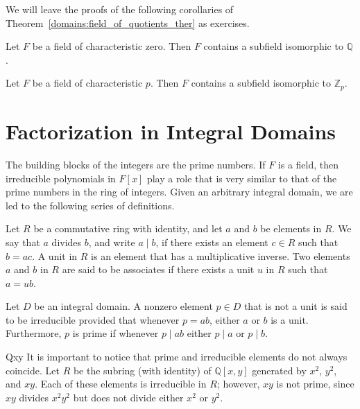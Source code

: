  

We will leave the proofs of the following corollaries of Theorem~\ref{domains:field_of_quotients_ther}
as exercises. 
 

\begin{corollary}\label{domains:char_zero_rationals_corollary}
Let $F$ be a field of characteristic zero. Then $F$ contains a
subfield isomorphic to ${\mathbb Q}$.	       
\end{corollary}


\begin{corollary}\label{domains:char_p_Zp_corollary}
Let $F$ be a field of characteristic $p$. Then $F$ contains a
subfield isomorphic to ${\mathbb Z}_p$.	       
\end{corollary}
 


\section{Factorization in Integral Domains}

 
The building blocks of the integers are the prime numbers.  If $F$ is
a field, then irreducible polynomials in $F[x]$ play a role that is
very similar to that of the prime numbers in the ring of integers.
Given an arbitrary integral domain, we are led to the following
series of definitions. 
 

Let $R$ be a commutative ring with identity, and let $a$ and $b$ be
elements in $R$.  We say that $a$ {\bfi divides} $b$, and write $a \mid
b$, if there exists an element $c \in R$ such that $b = ac$.  A {\bfi
unit\/} in $R$ is an element that has a multiplicative
inverse.  Two elements $a$ and $b$ in $R$ are said to be {\bfi
associates\/} if
there exists a unit $u$ in $R$ such that $a = ub$.   
 

Let $D$ be an integral domain.  A nonzero element $p \in D$ that is
not a unit is said to be {\bfi
irreducible\/}
provided that whenever $p = ab$, either $a$ or $b$ is a unit.
Furthermore, $p$ is {\bfi
prime\/} if whenever $p \mid
ab$ either $p \mid a$ or $p \mid b$.


\begin{example}{Qxy}
It is important to notice that prime and irreducible elements do not
always coincide. Let $R$ be the subring (with identity) of ${\mathbb Q}[x, y]$ generated
by $x^2$, $y^2$, and $xy$.  Each of these elements is irreducible in
$R$; however, $xy$ is not prime, since $xy$ divides $x^2 y^2$ but does
not divide either $x^2$ or $y^2$.
\end{example}

